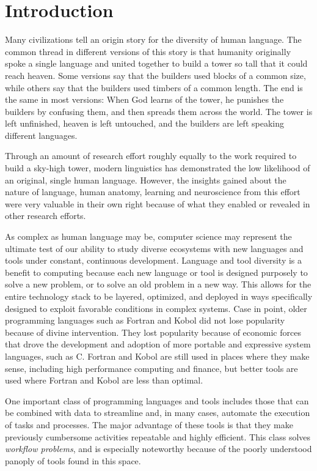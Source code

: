 \chapter{Introduction} \label{ch:introduction}

Many civilizations tell an origin story for the diversity of human language. The
common thread in different versions of this story is that humanity
originally spoke a single language and united together to build a tower so tall
that it could reach heaven. Some versions say that the builders used blocks of
a common size, while others say that the builders used timbers of a common
length. The end is the same in most versions: When God learns of the
tower, he punishes the builders by confusing them, and then spreads them across
the world. The tower is left unfinished, heaven is left untouched, and the
builders are left speaking different languages.

Through an amount of research effort roughly equally to the work required
to build a sky-high tower, modern linguistics has demonstrated the low
likelihood of an original, single human language. However, the insights gained
about the nature of language, human anatomy, learning and neuroscience from this
effort were very valuable in their own right because of what they enabled or
revealed in other research efforts.

As complex as human language may be, computer science may represent the ultimate
test of our ability to study diverse ecosystems with new languages and tools
under constant, continuous development. Language and tool diversity is a
benefit to computing because each new language or tool is designed purposely to
solve a new problem, or to solve an old problem in a new way. This allows for
the entire technology stack to  be layered, optimized, and deployed in ways
specifically designed to exploit favorable conditions in complex systems. Case
in point, older programming languages such as Fortran and Kobol did not lose
popularity because of divine intervention. They lost popularity because of
economic forces that drove the development and adoption of more portable and
expressive system languages, such as C. Fortran and Kobol are still used in
places where they make sense, including high performance computing and finance,
but better tools are used where Fortran and Kobol are less than optimal.

One important class of programming languages and tools includes those that
can be combined with data to streamline and, in many cases, automate the
execution of tasks and processes. The major advantage of these tools is that
they make previously cumbersome activities repeatable and highly efficient.
This class solves \textit{workflow problems}, and is especially noteworthy
because of the poorly understood panoply of tools found in this space.

